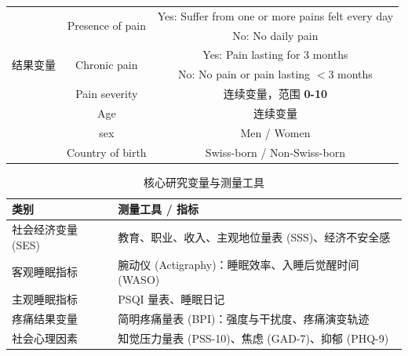 \documentclass[lang=cn,a4paper,newtx,code=minted,codebg=light]{elegantpaper}
\begin{document}
\begin{table}[!htbp]
\begin{tabularx}{\textwidth}{c c X}
        \multirow{6}{*}{结果变量} 
        & \multirow{2}{*}{Presence of pain} & \multicolumn{1}{c}{Yes: Suffer from one or more pains felt every day} \\
        & & \multicolumn{1}{c}{No: No daily pain} \\
        \cmidrule(lr){2-3}
        
        & \multirow{2}{*}{Chronic pain} & \multicolumn{1}{c}{Yes: Pain lasting for 3 months} \\
        & & \multicolumn{1}{c}{No: No pain or pain lasting $< 3$ months} \\
        \cmidrule(lr){2-3}
        
        & Pain severity & \multicolumn{1}{c}{连续变量，范围 \textbf{0-10}} \\
        \midrule
        
        \multirow{3}{*}{混杂因素} 
        & Age & \multicolumn{1}{c}{连续变量} \\
        & sex & \multicolumn{1}{c}{Men / Women} \\
        & Country of birth & \multicolumn{1}{c}{Swiss-born / Non-Swiss-born} \\
        \bottomrule
    \end{tabularx}
\end{table}

\begin{table}[!htbp]
    \centering
    \caption{核心研究变量与测量工具}
    \label{tab:variables}
    \begin{tabularx}{\textwidth}{l X}
        \toprule
        \textbf{类别} & \textbf{测量工具 / 指标} \\
        \midrule
        社会经济变量 (SES) & 教育、职业、收入、主观地位量表 (SSS)、经济不安全感 \\
        \addlinespace %
        客观睡眠指标 & 腕动仪 (Actigraphy)：睡眠效率、入睡后觉醒时间 (WASO) \\
        \addlinespace
        主观睡眠指标 & PSQI 量表、睡眠日记 \\
        \addlinespace
        疼痛结果变量 & 简明疼痛量表 (BPI)：强度与干扰度、疼痛演变轨迹 \\
        \addlinespace
        社会心理因素 & 知觉压力量表 (PSS-10)、焦虑 (GAD-7)、抑郁 (PHQ-9) \\
        \bottomrule
    \end{tabularx}
\end{table}
\end{document}
